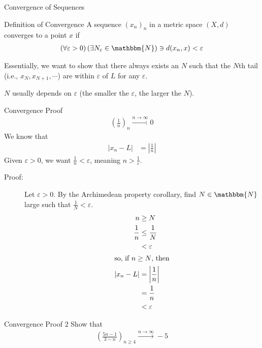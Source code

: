 \documentclass[10pt]{extarticle}
\newcommand{\N}{\mathbbm{N}}
\begin{document}
\begin{problem}{Convergence of Sequences}
\begin{problem}{Definition of Convergence}
      A sequence $(x_n)_n$ in a metric space $(X,d)$ converges to a point $x$ if
      \begin{align*}
        \left(\forall \varepsilon > 0\right)\left(\exists N_{\varepsilon}\in\N\right) \ni d(x_n,x) < \varepsilon
      \end{align*}
    \end{problem}
    Essentially, we want to show that there always exists an $N$ such that the $N$th tail (i.e., $x_{N}, x_{N+1},\cdots$) are within $\varepsilon$ of $L$ for any $\varepsilon$.
    \begin{description}
      \small
      \item[Note:] $N$ usually depends on $\varepsilon$ (the smaller the $\varepsilon$, the larger the $N$).
    \end{description}
    \begin{problem}{Convergence Proof}
      \begin{align*}
        \left(\frac{1}{n}\right)_{n} \xrightarrow{n\rightarrow\infty} 0
      \end{align*}
      \tcblower
      We know that
      \begin{align*}
        |x_n - L| &= \left|\frac{1}{n}\right|
      \end{align*}
      Given $\varepsilon > 0$, we want $\frac{1}{n} < \varepsilon$, meaning $n > \frac{1}{\varepsilon}$.
      \begin{description}
        \item[Proof:] Let $\varepsilon > 0$. By the Archimedean property corollary, find $N\in\N$ large such that $\frac{1}{N} < \varepsilon$.
          \begin{align*}
            n &\geq N\\
            \frac{1}{n} &\leq \frac{1}{N}\\
                        &< \varepsilon\\
            \shortintertext{so, if $n\geq N$, then}
            |x_n - L| &= \left|\frac{1}{n}\right|\\
                      &= \frac{1}{n}\\
                      &< \varepsilon
          \end{align*}
      \end{description}
    \end{problem}
    \begin{problem}{Convergence Proof 2}
      Show that
      \begin{align*}
        \left(\frac{5n-1}{3-n}\right)_{n\geq 4} \xrightarrow{n\rightarrow\infty} -5

\end{align*}
\end{problem}
\end{problem}
\end{document}
